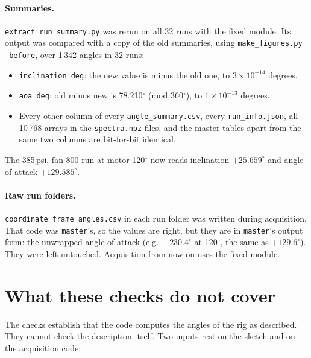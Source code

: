 \documentclass[11pt]{article}
\newcommand{\code}[1]{\texttt{#1}}
\begin{document}
\paragraph{Summaries.} \code{extract\_run\_summary.py} was rerun on all 32 runs
with the fixed module. Its output was compared with a copy of the old
summaries, using \code{make\_figures.py --before}, over 1\,342 angles in 32
runs:
\begin{itemize}
  \item \code{inclination\_deg}: the new value is minus the old one, to
        $3\times10^{-14}$ degrees.
  \item \code{aoa\_deg}: old minus new is 78.210$^\circ$ (mod 360$^\circ$),
        to $1\times10^{-13}$ degrees.
  \item Every other column of every \code{angle\_summary.csv}, every
        \code{run\_info.json}, all 10\,768 arrays in the \code{spectra.npz}
        files, and the master tables apart from the same two columns are
        bit-for-bit identical.
\end{itemize}
The 385\,psi, fan 800 run at motor 120$^\circ$ now reads inclination
$+25.659^\circ$ and angle of attack $+129.585^\circ$.

\paragraph{Raw run folders.} \code{coordinate\_frame\_angles.csv} in each run
folder was written during acquisition. That code was \code{master}'s, so the
values are right, but they are in \code{master}'s output form: the
unwrapped angle of attack (e.g.\ $-230.4^\circ$ at 120$^\circ$, the same as
$+129.6^\circ$). They were left untouched. Acquisition from now on uses the
fixed module.

\section{What these checks do not cover}

The checks establish that the code computes the angles of the rig as
described. They cannot check the description itself. Two inputs rest on
the sketch and on the acquisition code:
\end{document}
